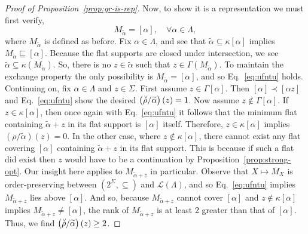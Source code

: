 \documentclass[11pt]{article}
\newcommand{\univ}{\Sigma}
\newcommand{\glang}{\Lambda}
\providecommand{\L}{}
\renewcommand{\L}{\mathscr{L}}
\begin{document}
\begin{proof}[Proof of Proposition~\ref{prop:gr-is-rep}]
    Now, to show it is a representation we must first verify,
    \begin{equation}\label{eq:ufntu}
        M_{\widetilde{\alpha}} = [\alpha],\quad\forall\alpha\in\glang,
    \end{equation}
    where $M_{\widetilde{\alpha}}$ is defined as before.
    Fix $\alpha \in \glang$, and see that $\widetilde{\alpha} \subseteq \kappa[\alpha]$ implies $M_{\widetilde{\alpha}}\sqsubseteq [\alpha]$.
    Because the flat supports are closed under intersection, we see $\widetilde{\alpha}\subseteq \kappa(M_{\widetilde{\alpha}})$.
    So, there is no $z \in \widetilde{\alpha}$ such that $z\in\Gamma(M_{\widetilde{\alpha}})$.
    To maintain the exchange property the only possibility is $M_{\widetilde{\alpha}}= [\alpha]$, and so Eq.~\ref{eq:ufntu} holds.
    Continuing on, fix $\alpha \in \glang$ and $z\in\univ$.
    First assume $z\in\Gamma[\alpha]$.
    Then $[\alpha]\prec[\alpha z]$ and Eq.~\ref{eq:ufntu} show the desired $\left(\accentset{\vee}{\rho}/\widetilde{\alpha}\right)(z) = 1$.
    Now assume $z \notin\Gamma[\alpha]$.
    If $z \in \kappa[\alpha]$, then once again with Eq.~\ref{eq:ufntu} it follows that the minimum flat containing $\widetilde{\alpha}+z$ in its flat support is $[\alpha]$ itself.
    Therefore, $z \in \kappa[\alpha]$ implies $\left(\rho/\widetilde{\alpha}\right)(z) = 0$.
    In the other case, where $z \notin\kappa[\alpha]$, there cannot exist any flat covering $[\alpha]$ containing $\widetilde{\alpha} + z$ in its flat support.
    This is because if such a flat did exist then $z$ would have to be a continuation by Proposition~\ref{prop:strong-opt}.
    Our insight here applies to $M_{\widetilde{\alpha}+z}$ in particular.
    Observe that $X \mapsto M_X$ is order-preserving between $\left(2^\univ,\subseteq\right)$ and $\L(\glang)$, and so Eq.~\ref{eq:ufntu} implies $M_{\widetilde{\alpha} + z}$ lies above $[\alpha]$.
    And so, because $M_{\widetilde{\alpha} + z}$ cannot cover $[\alpha]$ and $z\notin\kappa[\alpha]$ implies $M_{\widetilde{\alpha} + z}\neq[\alpha]$, the rank of $M_{\widetilde{\alpha}+z}$ is at least 2 greater than that of $[\alpha]$.
    Thus, we find $\left(\accentset{\vee}{\rho}/\widetilde{\alpha}\right)(z) \geq 2$.
\end{proof}
\end{document}

